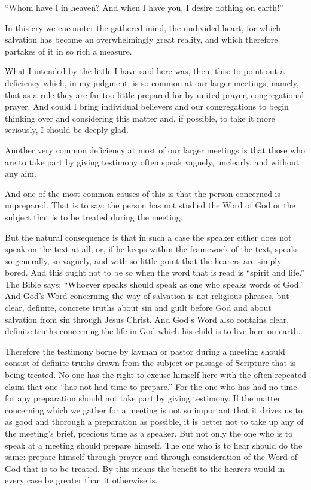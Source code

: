 “Whom have I in heaven? And when I have you, I desire nothing on earth!”

In this cry we encounter the gathered mind, the undivided heart, for which salvation has become an overwhelmingly great reality, and which therefore partakes of it in so rich a measure.

What I intended by the little I have said here was, then, this: to point out a deficiency which, in my judgment, is so common at our larger meetings, namely, that as a rule they are far too little prepared for by united prayer, congregational prayer. And could I bring individual believers and our congregations to begin thinking over and considering this matter and, if possible, to take it more seriously, I should be deeply glad.

Another very common deficiency at most of our larger meetings is that those who are to take part by giving testimony often speak vaguely, unclearly, and without any aim.

And one of the most common causes of this is that the person concerned is unprepared. That is to say: the person has not studied the Word of God or the subject that is to be treated during the meeting.

But the natural consequence is that in such a case the speaker either does not speak on the text at all, or, if he keeps within the framework of the text, speaks so generally, so vaguely, and with so little point that the hearers are simply bored. And this ought not to be so when the word that is read is “spirit and life.” The Bible says: “Whoever speaks should speak as one who speaks words of God.” And God’s Word concerning the way of salvation is not religious phrases, but clear, definite, concrete truths about sin and guilt before God and about salvation from sin through Jesus Christ. And God’s Word also contains clear, definite truths concerning the life in God which his child is to live here on earth.

Therefore the testimony borne by layman or pastor during a meeting should consist of definite truths drawn from the subject or passage of Scripture that is being treated. No one has the right to excuse himself here with the often-repeated claim that one “has not had time to prepare.” For the one who has had no time for any preparation should not take part by giving testimony. If the matter concerning which we gather for a meeting is not so important that it drives us to as good and thorough a preparation as possible, it is better not to take up any of the meeting’s brief, precious time as a speaker. But not only the one who is to speak at a meeting should prepare himself. The one who is to hear should do the same: prepare himself through prayer and through consideration of the Word of God that is to be treated. By this means the benefit to the hearers would in every case be greater than it otherwise is.

